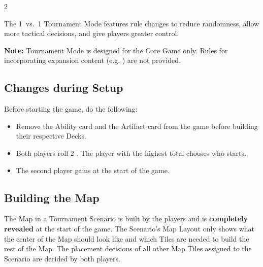 
\begin{multicols}{2}

The 1~vs.~1 Tournament Mode features rule changes to reduce randomness, allow more tactical decisions, and give players greater control.

\textbf{Note:} Tournament Mode is designed for the Core Game only. Rules for incorporating expansion content (e.g. ) are not provided.

\subsection*{Changes during Setup}

Before starting the game, do the following:
\begin{itemize}
  \item Remove the  Ability card and the  Artifact card from the game before building their respective Decks.
  \item Both players roll 2 . The player with the highest total chooses who starts.
  \item The second player gains  at the start of the game.
\end{itemize}

\subsection*{Building the Map}

The Map in a Tournament Scenario is built by the players and is \textbf{completely revealed} at the start of the game.
The Scenario's Map Layout only shows what the center of the Map should look like and which Tiles are needed to build the rest of the Map.
The placement decisions of all other Map Tiles assigned to the Scenario are decided by both players.


\end{multicols}
